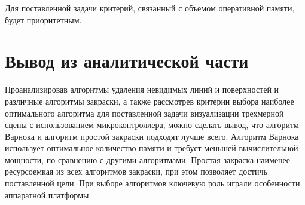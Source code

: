 Для поставленной задачи критерий, связанный с объемом оперативной памяти, будет приоритетным.

\section{Вывод из аналитической части}

Проанализировав алгоритмы удаления невидимых линий и поверхностей и различные алгоритмы закраски, а также рассмотрев критерии выбора наиболее оптимального алгоритма для поставленной задачи визуализации трехмерной сцены с использованием микроконтроллера, можно сделать вывод, что алгоритм Варнока и алгоритм простой закраски подходят лучше всего. 
Алгоритм Варнока использует оптимальное количество памяти и требует меньшей вычислительной мощности, по сравнению с другими алгоритмами. 
Простая закраска наименее ресурсоемкая из всех алгоритмов закраски, при этом позволяет достичь поставленной цели. При выборе алгоритмов ключевую роль играли особенности аппаратной платформы.
